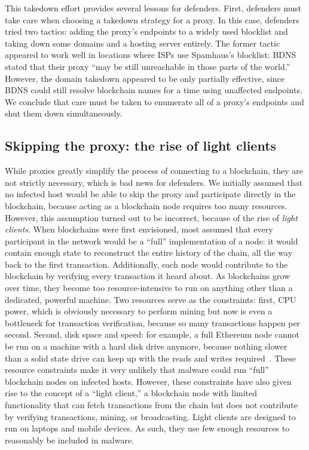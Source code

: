 This takedown effort provides several lessons for defenders. 
First, defenders must take care when choosing a takedown 
strategy for a proxy. In this case, defenders tried two 
tactics: 
adding the proxy's endpoints to a widely used blocklist and 
taking down some domains and a hosting server entirely. 
The former tactic appeared to work well in locations where 
ISPs use Spamhaus's blocklist: BDNS stated that their 
proxy ``may be still unreachable in those parts of the 
world.'' However, the domain takedown appeared to be 
only partially effective, since BDNS could still resolve 
blockchain names for a time using unaffected endpoints. We 
conclude that 
care must be taken to enumerate all of a proxy's endpoints 
and shut them down simultaneously.  



\subsection{Skipping the proxy: the rise of light clients}

While proxies greatly simplify the process of 
connecting to a blockchain, they are not strictly necessary, 
which is bad news for defenders. We initially assumed that no infected host 
would be able to 
skip the proxy and participate directly 
in the blockchain, because acting as a blockchain node 
requires too many resources. However, this assumption turned 
out to be incorrect, because of the rise of \emph{light 
clients}. When blockchains were first envisioned, most 
assumed that every participant in the network would be a 
``full'' implementation of a node: it would contain 
enough state to reconstruct the entire history of the chain, 
all the way back to the first transaction. Additionally, each 
node would contribute to the 
blockchain by verifying every transaction it heard about. As 
blockchains grow over time, they become too 
resource-intensive to run on anything other than a dedicated, 
powerful machine. Two resources serve as 
the constraints: first, CPU power, which is obviously 
necessary to perform mining but now is even a bottleneck for 
transaction verification, because so many transactions happen 
per second. Second, disk space and speed: for example, a full 
Ethereum node cannot be run on a machine with a hard disk 
drive anymore, because nothing slower than a solid state 
drive can keep up with the reads and writes 
required~\cite{geth_faq}. These 
resource constraints make it 
very unlikely that malware could run ``full'' blockchain 
nodes on infected hosts. However, these constraints have also
given rise to the concept of a ``light client,'' a blockchain 
node with limited functionality that can fetch transactions 
from the chain but does not contribute by verifying 
transactions, mining, or broadcasting. Light clients are 
designed to run on laptops and mobile devices. As such, they 
use few enough resources to reasonably be included in 
malware. 


